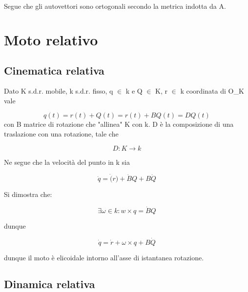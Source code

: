 \documentclass{article}
\begin{document}
        Segue che gli autovettori sono ortogonali secondo la metrica indotta da A.

        \section{Moto relativo}
        \subsection{Cinematica relativa}
        Dato K s.d.r. mobile, k s.d.r. fisso, q $\in$ k e Q $\in$ K, r $\in$ k coordinata di O\_K vale

\begin{equation}
    q(t)=r(t)+Q(t)= r(t)+ BQ(t)= DQ(t)
\end{equation}
con B matrice di rotazione che "allinea" K con k. D è la composizione di una traslazione con una rotazione, tale che

\begin{equation}
    D: K \rightarrow k
\end{equation}

Ne segue che la velocità del punto in k sia

\begin{equation}
    \dot{q}= \dot(r)+\dot{B}Q+ B\dot{Q}
\end{equation}

Si dimostra che:

\begin{equation}
    \exists \omega \in k : w \times q= \dot{B}Q
\end{equation}

dunque

\begin{equation}
    \dot{q}= \dot{r}+\omega \times q+ B\dot{Q}
\end{equation}

dunque il moto è elicoidale intorno all'asse di istantanea rotazione.

\subsection{Dinamica relativa}
\end{document}
